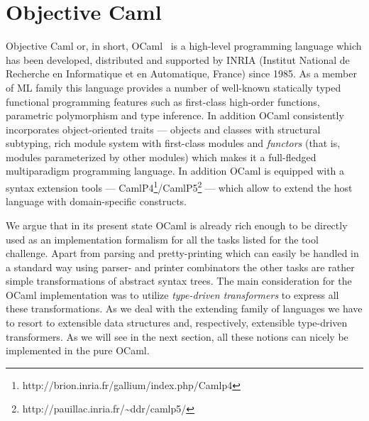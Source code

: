 \section{Objective Caml}

Objective Caml or, in short, OCaml~\cite{OcamlDef, Remy} is a high-level programming language which 
has been developed, distributed and supported by INRIA (Institut National de Recherche en 
Informatique et en Automatique, France) since 1985. As a member of ML family this language 
provides a number of well-known statically typed functional programming features such as
first-class high-order functions, parametric polymorphism and type inference. In addition
OCaml consistently incorporates object-oriented traits --- objects and classes with 
structural subtyping, rich module system with first-class modules and \emph{functors} (that is, 
modules parameterized by other modules) which makes it a full-fledged multiparadigm programming
language. In addition OCaml is equipped with a syntax extension tools --- 
CamlP4\footnote{http://brion.inria.fr/gallium/index.php/Camlp4}/CamlP5\footnote{http://pauillac.inria.fr/\textasciitilde ddr/camlp5/} --- which allow to extend the host language with domain-specific constructs. 

We argue that in its present state OCaml is already rich enough to be directly used as an 
implementation formalism for all the tasks listed for the tool challenge. Apart from parsing and 
pretty-printing which can easily be handled in a standard way using parser- and printer combinators 
the other tasks are rather simple transformations of abstract syntax trees. The main consideration
for the OCaml implementation was to utilize \emph{type-driven transformers} to express all these
transformations. As we deal with the extending family of languages we have to resort to extensible
data structures and, respectively, extensible type-driven transformers. As we will see in the next 
section, all these notions can nicely be implemented in the pure OCaml. 

